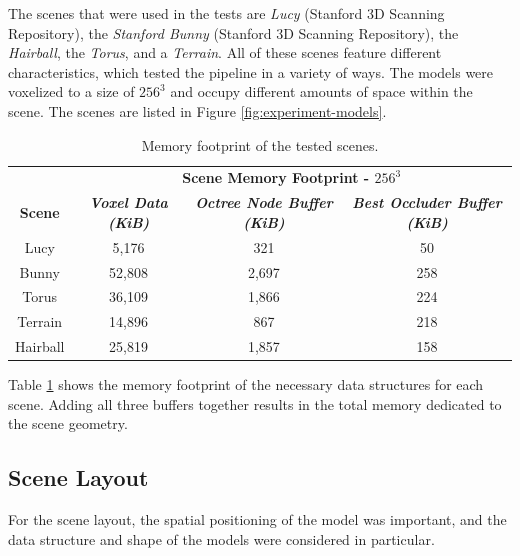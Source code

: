 \noindent
The scenes that were used in the tests are \emph{Lucy} (Stanford 3D Scanning Repository), the 
\emph{Stanford Bunny} (Stanford 3D Scanning Repository), the \emph{Hairball}, the \emph{Torus}, 
and a \emph{Terrain}. All of these scenes feature different characteristics, which tested 
the pipeline in a variety of ways. The models were voxelized to a size of $256^3$ and occupy 
different amounts of space within the scene. The scenes are listed in Figure 
\ref{fig:experiment-models}. \\

\begin{table}[htbp]
  \begin{center}
    \begin{tabular}{|c|c|c|c|}
      \hline
      \textbf{}&\multicolumn{3}{|c|}{\textbf{Scene Memory Footprint - $256^3$}} \\
      \cline{2-4} 
      \textbf{Scene} & \textbf{\textit{Voxel Data (KiB)}}& \textbf{\textit{Octree Node Buffer (KiB)}} & \textbf{\textit{Best Occluder Buffer (KiB)}} \\
      \hline
      Lucy        & 5,176   & 321   & 50  \\
      Bunny       & 52,808  & 2,697 & 258 \\
      Torus       & 36,109  & 1,866 & 224 \\
      Terrain     & 14,896  & 867   & 218 \\
      Hairball    & 25,819  & 1,857 & 158 \\
      \hline
    \end{tabular}
  \end{center}
  \caption{Memory footprint of the tested scenes.}
  \label{tbl:scene-data-size}
\end{table}

\noindent
Table \ref{tbl:scene-data-size} shows the memory footprint of the necessary data structures for 
each scene. Adding all three buffers together results in the total memory dedicated to the scene 
geometry.


\subsection*{Scene Layout} \label{subsec-scene-layout}

For the scene layout, the spatial positioning of the model was important, and the data structure and shape 
of the models were considered in particular. \\

